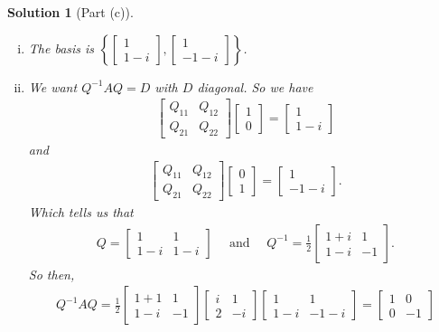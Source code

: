 \documentclass[leqno]{article}
\theoremstyle{nonumberplain}
\newtheorem{solution}{Solution}
\begin{document}
\begin{solution}[Part (c)]
\begin{enumerate}[i)]
\item The basis is $\left\{\begin{bmatrix} 1 \\ 1-i\end{bmatrix},\begin{bmatrix} 1 \\ -1-i \end{bmatrix}\right\}$. 

\item We want $Q^{-1}AQ=D$ with $D$ diagonal.  So we have
\begin{align*}
\begin{bmatrix}
Q_{11} & Q_{12}\\
Q_{21} & Q_{22}
\end{bmatrix}
\begin{bmatrix}
1\\
0
\end{bmatrix}
=\begin{bmatrix}
1\\
1-i
\end{bmatrix}
\end{align*}
and
\begin{align*}
\begin{bmatrix}
Q_{11} & Q_{12}\\
Q_{21} & Q_{22}
\end{bmatrix}
\begin{bmatrix}
0\\
1
\end{bmatrix}
=\begin{bmatrix}
1\\
-1-i
\end{bmatrix}.
\end{align*}
Which tells us that 
\begin{align*}
Q=\begin{bmatrix}
1 & 1\\
1-i & 1-i
\end{bmatrix} \textrm{~~~ and ~~~}
Q^{-1}=\frac{1}{2}\begin{bmatrix}
1+i & 1\\
1-i & -1
\end{bmatrix}.
\end{align*}
So then,
\begin{align*}
Q^{-1}AQ=
\frac{1}{2}\begin{bmatrix}
1+1 & 1\\
1-i & -1
\end{bmatrix}
\begin{bmatrix}
i & 1\\
2 & -i
\end{bmatrix}
\begin{bmatrix}
1 & 1\\
1-i & -1-i
\end{bmatrix}=
\begin{bmatrix}
1 & 0\\
0 & -1
\end{bmatrix}
\end{align*}

\end{enumerate}
\end{solution}
\end{document}
